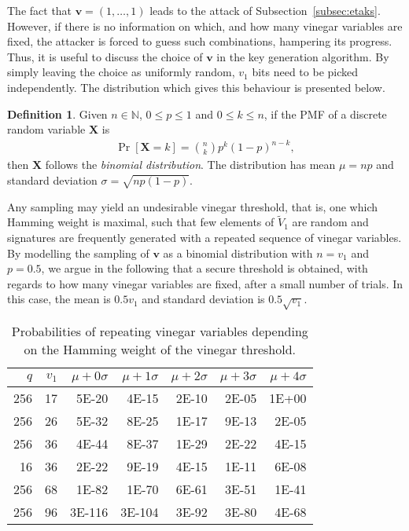 \documentclass[12pt, a4paper, oneside]{memoir}
\theoremstyle{definition}
\newtheorem{definition}[theorem]{Definition}
\begin{document}
The fact that $\mathbf{v} = (1, \dots, 1)$ leads to the attack of Subsection~\ref{subsec:etaks}. However, if there is no information on which, and how many vinegar variables are fixed, the attacker is forced to guess such combinations, hampering its progress. Thus, it is useful to discuss the choice of $\mathbf{v}$ in the key generation algorithm. By simply leaving the choice as uniformly random, $v_{1}$ bits need to be picked independently. The distribution which gives this behaviour is presented below.

\begin{definition}
  Given $n \in \mathbb{N}$, $0 \leq p \leq 1$ and $0 \leq k \leq n$, if the PMF of a discrete random variable $\mathbf{X}$ is
  \begin{align}
    \Pr[\mathbf{X} = k] = \binom{n}{k} p^{k} (1 - p)^{n - k},
  \end{align}
  then $\mathbf{X}$ follows the \emph{binomial distribution}. The distribution has mean $\mu = np$ and standard deviation $\sigma = \sqrt{np(1 - p)}$.
\end{definition}

Any sampling may yield an undesirable vinegar threshold, that is, one which Hamming weight is maximal, such that few elements of $\widetilde{V}_{1}$ are random and signatures are frequently generated with a repeated sequence of vinegar variables. By modelling the sampling of $\mathbf{v}$ as a binomial distribution with $n = v_{1}$ and $p = 0.5$, we argue in the following that a secure threshold is obtained, with regards to how many vinegar variables are fixed, after a small number of trials. In this case, the mean is $0.5 v_{1}$ and standard deviation is $0.5 \sqrt{v_{1}}$.

\begin{table}[htbp]
  \renewcommand{\arraystretch}{1.2}
  \setlength{\tabcolsep}{7pt}
  \centering
  \caption{Probabilities of repeating vinegar variables depending on the Hamming weight of the vinegar threshold.}\label{tab:bin-prob}
  \begin{tabular}{*{7}{r}}
    \toprule
    $q$ & $v_{1}$ & $\mu + 0\sigma$ & $\mu + 1\sigma$ & $\mu + 2\sigma$ & $\mu + 3\sigma$ & $\mu + 4\sigma$ \\
    \midrule
    256 &  17 & \num{ 5E-20} & \num{ 4E-15} & \num{ 2E-10} & \num{ 2E-05} & \num{ 1E+00} \\
    256 &  26 & \num{ 5E-32} & \num{ 8E-25} & \num{ 1E-17} & \num{ 9E-13} & \num{ 2E-05} \\
    256 &  36 & \num{ 4E-44} & \num{ 8E-37} & \num{ 1E-29} & \num{ 2E-22} & \num{ 4E-15} \\
     16 &  36 & \num{ 2E-22} & \num{ 9E-19} & \num{ 4E-15} & \num{ 1E-11} & \num{ 6E-08} \\
    256 &  68 & \num{ 1E-82} & \num{ 1E-70} & \num{ 6E-61} & \num{ 3E-51} & \num{ 1E-41} \\
    256 &  96 & \num{3E-116} & \num{3E-104} & \num{ 3E-92} & \num{ 3E-80} & \num{ 4E-68} \\
    \bottomrule
  \end{tabular}
\end{table}
\end{document}
